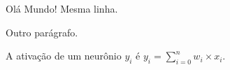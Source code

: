 \documentclass[a4paper, 12pt]{article}
\begin{document}
Olá       Mundo!
Mesma linha.

Outro parágrafo.

A ativação de um neurônio $y_i$ é $y_i = \sum_{i=0}^{n} w_i \times x_i$. 
\end{document}
